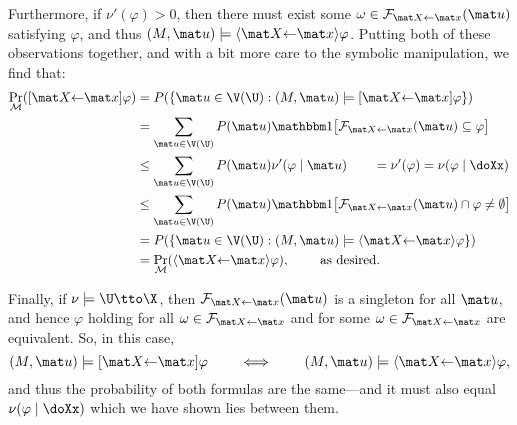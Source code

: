 \begin{subappendices}
\begin{lproof}
    Furthermore, if $\nu'(\varphi) > 0$, then there must exist some $\omega \in \mathcal F_{\mat X {\gets} \mat x}(\mat u)$ satisfying $\varphi$, and thus 
    $(M, \mat u) \models \langle \mat X {\gets}\mat x\rangle\varphi$. Putting both of these observations together, and with a bit more care to the symbolic manipulation, we find that:
    \begin{align*}
        \Pr_{\mathcal M}([\mat X {\gets} \mat x]\varphi) &= P(\{ 
            \mat u \in \V(\U) : (M, \mat u) \models [\mat X {\gets}\mat x]\varphi
        \})
        \\
        &= \sum_{\mat u \in \V(\U)} P(\mat u) \mathbbm 1
            \big[ \mathcal F_{\mat X \gets \mat x}(\mat u) \subseteq \varphi \big] \\
        &\le \sum_{\mat u \in \V(\U)} P(\mat u) \nu'(\varphi \mid \mat u) 
        \qquad = \nu'(\varphi) = \nu(\varphi \mid \doXx) \\
        &\le \sum_{\mat u \in \V(\U)} P(\mat u) \mathbbm 1
        \big[ \mathcal F_{\mat X {\gets} \mat x}(\mat u) \cap \varphi \ne \emptyset \big] \\
        &= P(\{ 
            \mat u \in \V(\U) : (M, \mat u) \models \langle\mat X {\gets}\mat x\rangle\varphi
        \})
        \\&= \Pr_{\mathcal M}(\langle\mat X {\gets} \mat x\rangle\varphi),
        \qquad\text{    as desired. }
    \end{align*}

    Finally, if $\nu \models \U \tto \X$, then $\mathcal F_{\mat X {\gets} \mat x}(\mat u)$ is a singleton for all $\mat u$, and hence $\varphi$ holding for all $\omega \in \mathcal F_{\mat X {\gets} \mat x}$ and for some $\omega \in \mathcal F_{\mat X {\gets} \mat x}$ are equivalent. 
    So, in this case, 
    \[
        (M, \mat u) \models [\mat X{\gets}\mat x]\varphi
        \qquad \iff \qquad
        (M, \mat u) \models \langle\mat X{\gets}\mat x\rangle\varphi,
    \]
    and thus the probability of both formulas are the same---and it must also equal $\nu(\varphi \mid \doXx)$ which we have shown lies between them. 
\end{lproof}



\end{subappendices}
